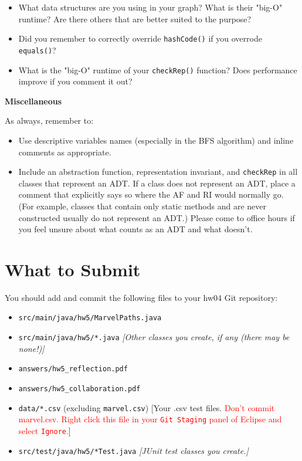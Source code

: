 \documentclass[11pt]{article}
\begin{document}
\begin{itemize}
\item What data structures are you using in your graph? What is their "big-O" runtime? Are there others that are better suited to the purpose?
\item Did you remember to correctly override \texttt{hashCode()} if you overrode \texttt{equals()}?
\item What is the "big-O" runtime of your \texttt{checkRep()} function? Does performance improve if you comment it out?
\end{itemize}
\newpage
\noindent \large{\textbf{Miscellaneous}}

\noindent As always, remember to:
\begin{itemize}
\item Use descriptive variables names (especially in the BFS algorithm) and inline comments as appropriate.
\item
Include an abstraction function, representation invariant, and \texttt{checkRep} in all classes that represent an ADT. If a class does not represent an ADT, place a comment that explicitly says so where the AF and RI would normally go. (For example, classes that contain only static methods and are never constructed usually do not represent an ADT.) Please come to office hours if you feel unsure about what counts as an ADT and what doesn't.
\end{itemize}

\section*{What to Submit}
You should add and commit the following files to your hw04 Git repository:
\begin{itemize}
\item \texttt{src/main/java/hw5/MarvelPaths.java}
\item \texttt{src/main/java/hw5/*.java} \textit{[Other classes you create, if any (there may be none!)]}
\item \texttt{answers/hw5\_reflection.pdf}
\item \texttt{answers/hw5\_collaboration.pdf}
\item \texttt{data/*.csv} (excluding \texttt{marvel.csv}) [Your .csv test files. \textcolor{red}{Don't commit marvel.csv. Right click this file in your \texttt{Git Staging} panel of Eclipse and select \texttt{Ignore}.}]
\item \texttt{src/test/java/hw5/*Test.java} \textit{[JUnit test classes you create.]}
\end{itemize}
\end{document}
